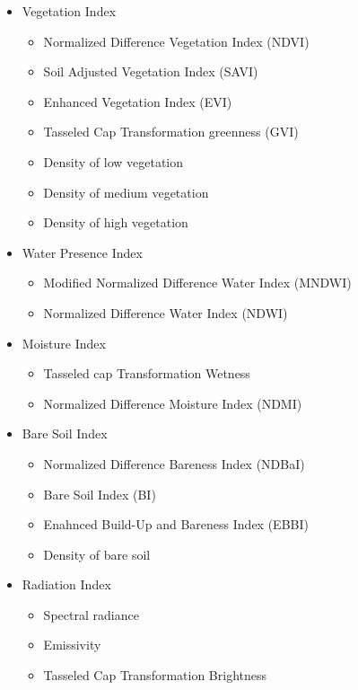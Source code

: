 \begin{itemize}
    \item Vegetation Index
    \begin{itemize}
        \item Normalized Difference Vegetation Index (NDVI)
        \item Soil Adjusted Vegetation Index (SAVI)
        \item Enhanced Vegetation Index (EVI)
        \item Tasseled Cap Transformation greenness (GVI)
        \item Density of low vegetation
        \item Density of medium vegetation
        \item Density of high vegetation
    \end{itemize}
    \item Water Presence Index
    \begin{itemize}
        \item Modified Normalized Difference Water Index (MNDWI)
        \item Normalized Difference Water Index (NDWI)
    \end{itemize}
    \item Moisture Index
    \begin{itemize}
        \item Tasseled cap Transformation Wetness
        \item Normalized Difference Moisture Index (NDMI)
    \end{itemize}
    \item Bare Soil Index
    \begin{itemize}
        \item Normalized Difference Bareness Index (NDBaI)
        \item Bare Soil Index (BI)
        \item Enahnced Build-Up and Bareness Index (EBBI)
        \item Density of bare soil
    \end{itemize}
    \item Radiation Index
    \begin{itemize}
        \item Spectral radiance
        \item Emissivity
        \item Tasseled Cap Transformation Brightness
    \end{itemize}

\end{itemize}
